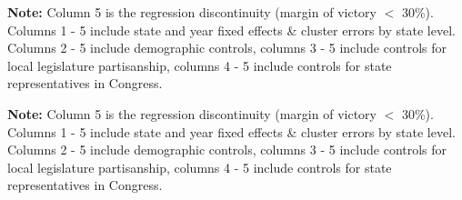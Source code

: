 \documentclass{article}
\begin{document}
\begin{table}[!hbtp]

\textbf{Note:} Column 5 is the regression discontinuity (margin of victory $<$ 30\%). Columns 1 - 5 include state and year fixed effects \& cluster errors by state level. Columns 2 - 5 include demographic controls, columns 3 - 5 include controls for local legislature partisanship, columns 4 - 5 include controls for state representatives in Congress.
\end{table}

\begin{table}[!hbtp]

\textbf{Note:} Column 5 is the regression discontinuity (margin of victory $<$ 30\%). Columns 1 - 5 include state and year fixed effects \& cluster errors by state level. Columns 2 - 5 include demographic controls, columns 3 - 5 include controls for local legislature partisanship, columns 4 - 5 include controls for state representatives in Congress.
\end{table}
\end{document}
